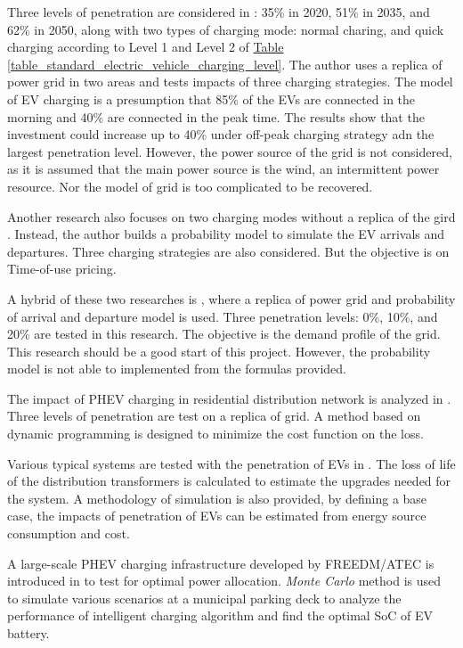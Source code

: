 \documentclass[12pt,a4paper]{report}
\begin{document}
        Three levels of penetration are considered in \cite{paper:PieltainFernandez2011}: 35\% in 2020, 51\% in 2035, and 62\% in 2050, along with two types of charging mode: normal charing, and quick charging according to Level 1 and Level 2 of \hyperref[table_standard_electric_vehicle_charging_level]{Table \ref*{table_standard_electric_vehicle_charging_level}}. The author uses a replica of power grid in two areas and tests impacts of three charging strategies. The model of EV charging is a presumption that 85\% of the EVs are connected in the morning and 40\% are connected in the peak time. The results show that the investment could increase up to 40\% under off-peak charging strategy adn the largest penetration level. However, the power source of the grid is not considered, as it is assumed that the main power source is the wind, an intermittent power resource. Nor the model of grid is too complicated to be recovered.

        Another research also focuses on two charging modes without a replica of the gird \cite{paper:Shao2010}. Instead, the author builds a probability model to simulate the EV arrivals and departures. Three charging strategies are also considered. But the objective is on Time-of-use pricing.

        A hybrid of these two researches is \cite{paper:Qian2011}, where a replica of power grid and probability of arrival and departure model is used. Three penetration levels: 0\%, 10\%, and 20\% are tested in this research. The objective is the demand profile of the grid. This research should be a good start of this project. However, the probability model is not able to implemented from the formulas provided.
        
        The impact of PHEV charging in residential distribution network is analyzed in \cite{paper:MousaviAgah2012}. Three levels of penetration are test on a replica of grid. A method based on dynamic programming is designed to minimize the cost function on the loss.

        Various typical systems are tested with the penetration of EVs in \cite{paper:variousimpactofEV}. The loss of life of the distribution transformers is calculated to estimate the upgrades needed for the system. A methodology of simulation is also provided, by defining a base case, the impacts of penetration of EVs can be estimated from energy source consumption and cost.

        A large-scale PHEV charging infrastructure developed by FREEDM/ATEC is introduced in \cite{paper:EVimpactmonte} to test for optimal power allocation. \emph{Monte Carlo} method is used to simulate various scenarios at a municipal parking deck to analyze the performance of intelligent charging algorithm and find the optimal SoC of EV battery.
\end{document}

